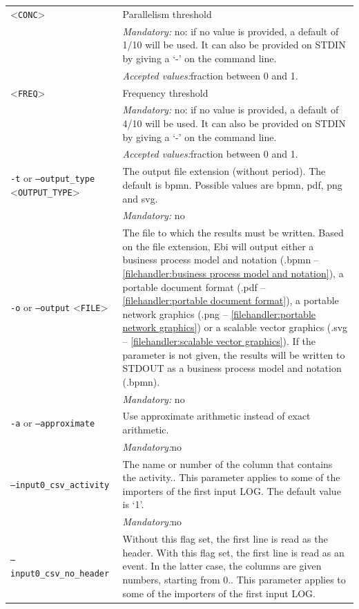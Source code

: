 {\begin{tabularx}{\linewidth}{lX}
<\texttt{CONC}>&Parallelism threshold\\
&\textit{Mandatory:} \quad no: if no value is provided, a default of 1/10 will be used. It can also be provided on STDIN by giving a `-' on the command line.\\
&\textit{Accepted values:}\quad fraction between 0 and 1.\\
<\texttt{FREQ}>&Frequency threshold\\
&\textit{Mandatory:} \quad no: if no value is provided, a default of 4/10 will be used. It can also be provided on STDIN by giving a `-' on the command line.\\
&\textit{Accepted values:}\quad fraction between 0 and 1.\\
\texttt{-t} or \texttt{--output\_type} <\texttt{OUTPUT\_TYPE}> &
The output file extension (without period). The default is bpmn. Possible values are bpmn, pdf, png and svg.\\
&\textit{Mandatory:} \quad no\\
\texttt{-o} or \texttt{--output} <\texttt{FILE}> &
The file to which the results must be written. Based on the file extension, Ebi will output either a business process model and notation (.bpmn -- \cref{filehandler:business process model and notation}), a portable document format (.pdf -- \cref{filehandler:portable document format}), a portable network graphics (.png -- \cref{filehandler:portable network graphics}) or a scalable vector graphics (.svg -- \cref{filehandler:scalable vector graphics}).
If the parameter is not given, the results will be written to STDOUT as a business process model and notation (.bpmn).\\
&\textit{Mandatory:} \quad no\\
\texttt{-a} or \texttt{--approximate} & Use approximate arithmetic instead of exact arithmetic.\\
&\textit{Mandatory:}\quad no\\
\texttt{--input0\_csv\_activity} & The name or number of the column that contains the activity.. This parameter applies to some of the importers of the first input LOG. The default value is `1'.\\
&\textit{Mandatory:}\quad no\\
\texttt{--input0\_csv\_no\_header} & Without this flag set, the first line is read as the header. 
    With this flag set, the first line is read as an event. In the latter case, the columns are given numbers, starting from 0.. This parameter applies to some of the importers of the first input LOG. \\

\end{tabularx}}
